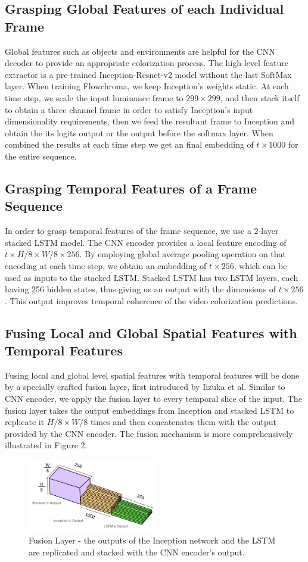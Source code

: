 \documentclass[10pt,twocolumn,letterpaper]{article}
\begin{document}
\subsection{Grasping Global Features of each Individual Frame}
Global features such as objects and environments are helpful for the CNN decoder to provide an appropriate colorization process. The high-level feature extractor is a pre-trained Inception-Resnet-v2 model without the last SoftMax layer. When training Flowchroma, we keep Inception’s weights static. At each time step, we scale the input luminance frame to $299\times 299$, and then stack itself to obtain a three channel frame in order to satisfy Inception’s input dimensionality requirements, then we feed the resultant frame to Inception and obtain the its logits output or the output before the softmax layer. When combined the results at each time step we get an final embedding of $t\times 1000$ for the entire sequence.


\subsection{Grasping Temporal Features of a Frame Sequence}
In order to grasp temporal features of the frame sequence, we use a 2-layer stacked LSTM model. The CNN encoder provides a local feature encoding of  $t\times H/8\times W/8\times 256$. By employing global average pooling operation on that encoding at each time step, we obtain an embedding of $t\times 256$, which can be used as inputs to the stacked LSTM. Stacked LSTM has two LSTM layers, each having 256 hidden states, thus giving us an output with the dimensions of $t\times 256$. This output improves temporal coherence of the video colorization predictions.

\subsection{Fusing Local and Global Spatial Features with Temporal Features}
Fusing local and global level spatial features with temporal features will be done by a specially crafted fusion layer, first introduced by Iizuka et al. Similar to CNN encoder, we apply the fusion layer to every temporal slice of the input. The fusion layer takes the output embeddings from Inception and stacked LSTM to replicate it $H/8\times W/8$ times and then concatenates them with the output provided by the CNN encoder. The fusion mechanism is more comprehensively illustrated in Figure 2.

\begin{figure}[!h]
  \centering
  \includegraphics[width=0.5\textwidth]{fusion-layer.png}
  \caption{Fusion Layer - the outputs of the Inception network and the LSTM are replicated and stacked with the CNN encoder's output.}
\end{figure}
\end{document}
